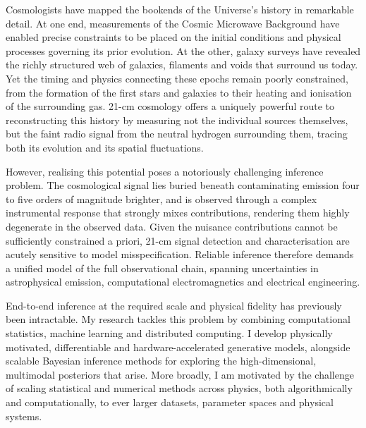 \documentclass[12pt,a4paper]{awesome-cv}
\renewcommand*{\bodyfont}{\rmfamily}
\renewcommand*{\lettertitlestyle}[1]{{\fontsize{14pt}{18pt}\bodyfont\bfseries\color{darktext}\underline{#1}}}
\begin{document}
\makecvheader[R]
\par\vspace{1mm}
\noindent\lettertitlestyle{Research Statement}\hfill{}\par
\vspace{1mm}

\begin{cvletter}
Cosmologists have mapped the bookends of the Universe's history in remarkable detail. At one end, measurements of the Cosmic Microwave Background have enabled precise constraints to be placed on the initial conditions and physical processes governing its prior evolution. At the other, galaxy surveys have revealed the richly structured web of galaxies, filaments and voids that surround us today. Yet the timing and physics connecting these epochs remain poorly constrained, from the formation of the first stars and galaxies to their heating and ionisation of the surrounding gas. 21-cm cosmology offers a uniquely powerful route to reconstructing this history by measuring not the individual sources themselves, but the faint radio signal from the neutral hydrogen surrounding them, tracing both its evolution and its spatial fluctuations.

However, realising this potential poses a notoriously challenging inference problem. The cosmological signal lies buried beneath contaminating emission four to five orders of magnitude brighter, and is observed through a complex instrumental response that strongly mixes contributions, rendering them highly degenerate in the observed data. Given the nuisance contributions cannot be sufficiently constrained a priori, 21-cm signal detection and characterisation are acutely sensitive to model misspecification. Reliable inference therefore demands a unified model of the full observational chain, spanning uncertainties in astrophysical emission, computational electromagnetics and electrical engineering.

End-to-end inference at the required scale and physical fidelity has previously been intractable. My research tackles this problem by combining computational statistics, machine learning and distributed computing. I develop physically motivated, differentiable and hardware-accelerated generative models, alongside scalable Bayesian inference methods for exploring the high-dimensional, multimodal posteriors that arise. More broadly, I am motivated by the challenge of scaling statistical and numerical methods across physics, both algorithmically and computationally, to ever larger datasets, parameter spaces and physical systems.


\end{cvletter}
\end{document}
